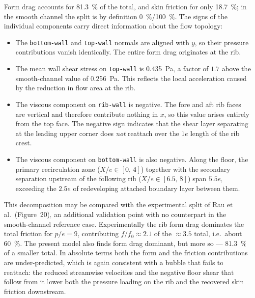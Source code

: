\documentclass[11pt,a4paper]{article}
\begin{document}
Form drag accounts for \SI{81.3}{\percent} of the total, and skin friction
for only \SI{18.7}{\percent}; in the smooth channel the split is by
definition \SI{0}{\percent}/\SI{100}{\percent}. The signs of the individual
components carry direct information about the flow topology:

\begin{itemize}
  \item The \texttt{bottom-wall} and \texttt{top-wall} normals are aligned
  with $y$, so their pressure contributions vanish identically. The entire
  form drag originates at the rib.

  \item The mean wall shear stress on \texttt{top-wall} is
  \SI{0.435}{\pascal}, a factor of $1.7$ above the smooth-channel value of
  \SI{0.256}{\pascal}. This reflects the local acceleration caused by the
  reduction in flow area at the rib.

  \item The viscous component on \texttt{rib-wall} is negative. The fore and
  aft rib faces are vertical and therefore contribute nothing in $x$, so
  this value arises entirely from the top face. The negative sign indicates
  that the shear layer separating at the leading upper corner does
  \emph{not} reattach over the $1e$ length of the rib crest.

  \item The viscous component on \texttt{bottom-wall} is also negative. Along
  the floor, the primary recirculation zone ($X/e \in [0,\,4]$) together with
  the secondary separation upstream of the following rib
  ($X/e \in [6.5,\,8]$) span $5.5e$, exceeding the $2.5e$ of redeveloping
  attached boundary layer between them.
\end{itemize}

This decomposition may be compared with the experimental split of
Rau et al.\ (Figure~20), an additional validation point with no counterpart
in the smooth-channel reference case. Experimentally the rib form drag
dominates the total friction for $p/e = 9$, contributing $f/f_{0} \approx 2.1$
of the $\approx 3.5$ total, i.e.\ about \SI{60}{\percent}. The present model
also finds form drag dominant, but more so --- \SI{81.3}{\percent} of a
smaller total. In absolute terms both the form and the friction
contributions are under-predicted, which is again consistent with a bubble
that fails to reattach: the reduced streamwise velocities and the negative
floor shear that follow from it lower both the pressure loading on the rib
and the recovered skin friction downstream.
\end{document}
